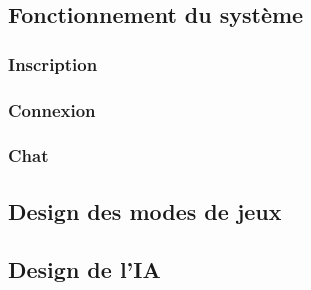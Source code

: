 \documentclass[utf8]{article}
\begin{document}
  \subsection{Fonctionnement du système}
    \subsubsection{Inscription}
    \subsubsection{Connexion}
    \subsubsection{Chat}
  \subsection{Design des modes de jeux}
  \subsection{Design de l'IA}



\end{document}
